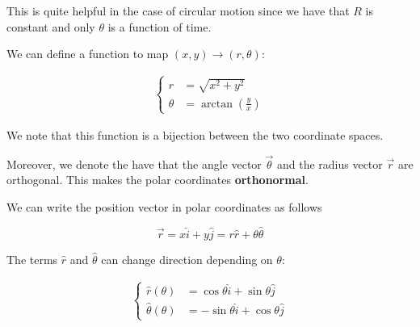 \documentclass[10pt]{extarticle}
\begin{document}
This is quite helpful in the case of circular motion since we have that $R$ is constant
and only $\theta$ is a function of time.

We can define a function to map $(x, y) \to (r, \theta)$:

\begin{align*}
  \begin{cases}
    r      & = \sqrt{x^2 + y^2}                \\
    \theta & = \arctan\left(\frac{y}{x}\right)
  \end{cases}
\end{align*}

We note that this function is a bijection between the two coordinate spaces.

Moreover, we denote the have that the angle vector $\vec \theta$
and the radius vector $\vec r$ are orthogonal. This makes the polar coordinates \textbf{orthonormal}.

\begin{center}

  \label{fig:polar_frame}
\end{center}

We can write the position vector in polar coordinates as follows

$$
  \vec r = x \hat i + y \hat j = r \hat r + \theta \hat \theta
$$

The terms $\hat r$ and $\hat \theta$ can change direction depending on $\theta$:

\begin{align*}
  \begin{cases}
    \hat r(\theta)      & = \cos \theta \hat i + \sin \theta \hat j   \\
    \hat \theta(\theta) & = - \sin \theta \hat i + \cos \theta \hat j
  \end{cases}
\end{align*}
\end{document}
